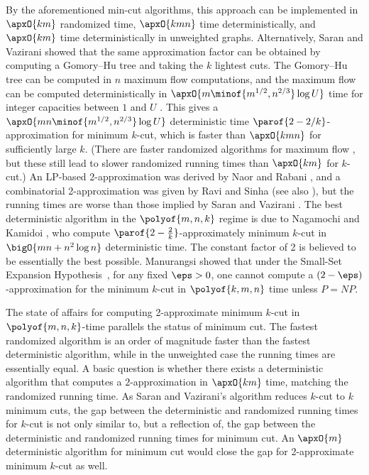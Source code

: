 \documentclass{toc}
\begin{document}
By the aforementioned min-cut algorithms, this approach can be
implemented in $\apxO{k m}$ randomized time, $\apxO{k m n}$ time
deterministically, and $\apxO{k m}$ time deterministically in
unweighted graphs. Alternatively, Saran and Vazirani \cite{sv-95}
showed that the same approximation factor can be obtained by computing
a Gomory--Hu tree and taking the $k$ lightest cuts. The Gomory--Hu
tree can be computed in $n$ maximum flow computations, and the maximum
flow can be computed deterministically in
\begin{math}
  \apxO{m \minof{m^{1/2}, n^{2/3}} \log U}
\end{math}
time for integer capacities between $1$ and $U$ \cite{gr-98}. This
gives a $\apxO{m n \minof{m^{1/2}, n^{2/3}} \log U}$ deterministic time
$\parof{2 - 2/k}$-approximation for minimum $k$-cut, which is faster
than $\apxO{k m n}$ for sufficiently large $k$. (There are faster
randomized algorithms for maximum flow \cite{ls-14,madry-16}, but
these still lead to slower randomized running times than $\apxO{k m}$
for $k$-cut.) An %
LP-based  %
2-approximation was derived by Naor and
Rabani \cite{nr-01}, and a combinatorial 2-approximation was given by
Ravi and Sinha \cite{rs-08} (see also \cite{barahona-00}), but the
running times are worse than those implied by Saran and Vazirani
\cite{sv-95}. The best deterministic algorithm in the
%
$\polyof{m,n,k}$ %
regime is due to Nagamochi and Kamidoi \cite{nk}, who compute
$\parof{2 - \frac{2}{k}}$-approximately minimum
%
$k$-cut in   %
$\bigO{m n + n^2 \log n}$ deterministic time. The constant factor of 2
is believed to be essentially the best possible.  Manurangsi
\cite{manurangsi-17} showed that under the
%
Small-Set Expansion Hypothesis~\cite{RS10}, %
%
%
for any fixed $\eps > 0$, one cannot compute a
$(2-\eps)$-approximation for the minimum $k$-cut in $\polyof{k,m,n}$
time unless $P = NP$.

The state of affairs for computing 2-approximate minimum
     $k$-cut  %
in $\polyof{m,n,k}$-time parallels the status of minimum cut. The fastest
randomized algorithm is an order of magnitude faster than the fastest
deterministic algorithm, while in the unweighted case the running
times are essentially equal. A basic question is whether there exists
a deterministic algorithm that computes a $2$-approximation in
$\apxO{k m}$ time, matching the randomized running time. As
Saran and Vazirani's algorithm reduces $k$-cut to $k$ minimum cuts,
the gap between the deterministic and randomized running times for
$k$-cut is not only similar to, but a reflection of, the gap between
the deterministic and randomized running times for minimum cut. An
$\apxO{m}$ deterministic algorithm for minimum cut would close the gap
for 2-approximate
minimum  %
$k$-cut as well.
\end{document}
